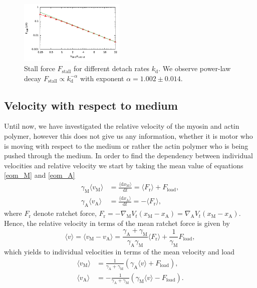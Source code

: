 \documentclass[aps,pre,twocolumn,showpacs,showkeys]{revtex4-1}
\newcommand{\rmd}{{\mathrm d}}
\begin{document}
\begin{figure}[t]
\centering
\includegraphics[width=0.45\textwidth,height=!]{k_Fstall}
\caption{Stall force $F_\text{stall}$ for different detach rates $k_\text{d}$.
We observe power-law decay $F_\text{stall} \propto k_\text{d}^{-\alpha}$ with exponent $\alpha = 1.002 \pm 0.014$. 
}
\label{Fig: k_Fstall} 
\end{figure}

\subsection{Velocity with respect to medium}
Until now, we have investigated the relative velocity of the myosin and actin polymer, however this does not give us any information,
whether it is motor who is moving with respect to the medium or rather the actin polymer who is being pushed through the medium.
In order to find the dependency between individual velocities and relative velocity we start by taking the mean value of equations \eqref{eom_M} and \eqref{eom_A}
\begin{align}
\gamma_\text{M} \langle v_\text{M} \rangle &= \frac{ \langle \rmd x_\text{M} \rangle }{\rmd t} = \langle F_\text{r} \rangle + F_\text{load} , \label{pre_velocity_M} \\
\gamma_\text{A} \langle v_\text{A} \rangle &= \frac{ \langle \rmd x_\text{A} \rangle }{\rmd t} = -\langle F_\text{r} \rangle , \label{pre_velocity_A}
\end{align}
where $F_\text{r}$ denote ratchet force, 
$F_\text{r} = - \nabla_\text{M} V_t( x_\text{M} - x_\text{A} ) = \nabla_\text{A} V_t(x_\text{M} - x_\text{A} )$. 
Hence, the relative velocity in terms of the mean ratchet force is given by 
\begin{equation*}
\langle v \rangle 
= \langle v_\text{M} - v_\text{A} \rangle 
= \frac{\gamma_\text{A} + \gamma_\text{M}}{\gamma_\text{A} \gamma_\text{M}} \langle F_\text{r} \rangle + \frac{1}{\gamma_\text{M}} F_\text{load} ,
\end{equation*}
which yields to individual velocities in terms of the mean velocity and load 
\begin{align}
\langle v_\text{M} \rangle &= \frac{1}{ \gamma_\text{A} + \gamma_\text{M} } \left( \gamma_\text{A} \langle v \rangle + F_\text{load} \right) ,
\label{velocity_M} \\
\langle v_\text{A} \rangle &= -\frac{1}{ \gamma_\text{A} + \gamma_\text{M} } \left( \gamma_\text{M} \langle v \rangle - F_\text{load} \right) .
\label{velocity_A}
\end{align}
\end{document}
